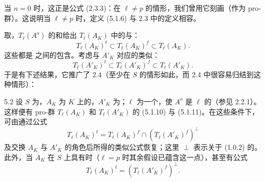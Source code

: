 当 $n=0$ 时，这正是公式 (2.3.3)：在 $\ell\ne p$ 的情形，我们曾用它刻画（作为 pro-群）。这说明当 $\ell\ne p$ 时，定义 (5.1.6) 与 2.3 中的定义相容。

取，$T_\ell(A^o)$ 的和给出 $T_\ell(A_K)$ 中的与：
\[
T_\ell(A_K)^t\subset T_\ell(A_K)^f\subset T_\ell(A_K).\tag{5.1.10}
\]
这些都是 之间的包含。考虑与 $A'_K$ 对应的类似：
\[
T_\ell(A'_K)^t\subset T_\ell(A'_K)^f\subset T_\ell(A'_K).\tag{5.1.11}
\]
于是有下述结果，它推广了 2.4（至少在 $S$ 的情形如此，而 2.4 中很容易归结到这种情形）：
\begin{SGAresult}{}{5.2}
设 $S$ 为，$A_K$ 为 $K$ 上的，$A'_K$ 为；$\ell$ 为一个，使  $A^o$ 是 $\ell$ 的（参见 2.2.1）。这样便有 pro-群 $T_\ell(A_K)$ 和 $T_\ell(A'_K)$ 的 (5.1.10) 与 (5.1.11)。在这些条件下，可由通过公式
\[
T_\ell(A_K)^t=T_\ell(A_K)^f\cap(T_\ell(A'_K)^f)^\perp\tag{5.2.1}
\]
及交换 $A_K$ 与 $A'_K$ 的角色后所得的类似公式恢复；这里 $\perp$ 表示关于 (1.0.2) 的。
此外，当 $A_K$ 在 $S$ 上具有时（$\ell=p$ 时其余假设已蕴含这一点），甚至有公式
\[
T_\ell(A_K)^t=(T_\ell(A'_K)^f)^\perp.\tag{5.2.2}
\]
\end{SGAresult}

